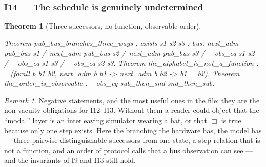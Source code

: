 \documentclass[10pt,journal,compsoc,twocolumn]{article}
\newtheorem{theorem}{Theorem}[section]
\theoremstyle{definition}
\theoremstyle{remark}
\newtheorem{remark}{Remark}[section]
\theoremstyle{plain}
\begin{document}
\subsubsection*{I14 --- The schedule is genuinely undetermined}
\begin{theorem}[Three successors, no function, observable order]
\begin{coc}
Theorem pub_bus_branches_three_ways : exists s1 s2 s3 : bus,
  next_adm pub_bus s1 /\ next_adm pub_bus s2 /\ next_adm pub_bus s3
  /\ ~ obs_eq s1 s2 /\ ~ obs_eq s1 s3 /\ ~ obs_eq s2 s3.
Theorem the_alphabet_is_not_a_function :
  ~ (forall b b1 b2, next_adm b b1 -> next_adm b b2 -> b1 = b2).
Theorem the_order_is_observable : ~ obs_eq sub_then_snd snd_then_sub.
\end{coc}\end{theorem}
\begin{remark}
Negative statements, and the most useful ones in the file: they are the
non-vacuity obligations for I12--I13. Without them a reader could object that the
``modal'' layer is an interleaving simulator wearing a hat, or that \(\Box\) is
true because only one step exists. Here the branching the hardware has, the
model has --- three pairwise distinguishable successors from one state, a step
relation that is not a function, and an order of protocol calls that a bus
observation can see --- and the invariants of I9 and I13 still hold.
\end{remark}
\end{document}
